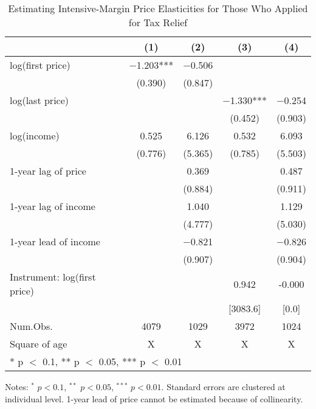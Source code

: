 \documentclass[
  11pt,
  a4paper,
]{article}
\begin{document}
\begin{table}

\caption{\label{tab:R1Elasticity}Estimating Intensive-Margin Price Elasticities for Those Who Applied for Tax Relief}
\centering
\fontsize{8}{10}\selectfont
\begin{threeparttable}
\begin{tabular}[t]{lcccc}
\toprule
  & (1) & (2) & (3) & (4)\\
\midrule
log(first price) & \num{-1.203}*** & \num{-0.506} &  & \\
 & (\num{0.390}) & (\num{0.847}) &  & \\
log(last price) &  &  & \num{-1.330}*** & \num{-0.254}\\
 &  &  & (\num{0.452}) & (\num{0.903})\\
log(income) & \num{0.525} & \num{6.126} & \num{0.532} & \num{6.093}\\
 & (\num{0.776}) & (\num{5.365}) & (\num{0.785}) & (\num{5.503})\\
1-year lag of price &  & \num{0.369} &  & \num{0.487}\\
 &  & (\num{0.884}) &  & (\num{0.911})\\
1-year lag of income &  & \num{1.040} &  & \num{1.129}\\
 &  & (\num{4.777}) &  & (\num{5.030})\\
1-year lead of income &  & \num{-0.821} &  & \num{-0.826}\\
 &  & (\num{0.907}) &  & (\num{0.904})\\
\midrule
Instrument: log(first price) &  &  & 0.942 & -0.000\\
 &  &  & [3083.6] & [0.0]\\
Num.Obs. & \num{4079} & \num{1029} & \num{3972} & \num{1024}\\
Square of age & X & X & X & X\\
\bottomrule
\multicolumn{5}{l}{\rule{0pt}{1em}* p $<$ 0.1, ** p $<$ 0.05, *** p $<$ 0.01}\\
\end{tabular}
\begin{tablenotes}
\item Notes: $^{*}$ $p < 0.1$, $^{**}$ $p < 0.05$, $^{***}$ $p < 0.01$. Standard errors are clustered at individual level. 1-year lead of price cannot be estimated because of collinearity.
\end{tablenotes}
\end{threeparttable}
\end{table}
\end{document}
